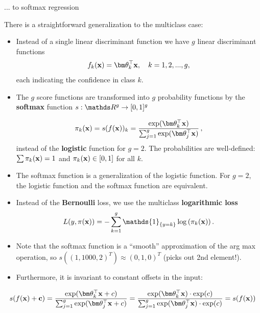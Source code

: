 \documentclass[11pt,compress,t,notes=noshow, xcolor=table]{beamer}
\begin{document}
\begin{vbframe}{... to softmax regression} 

There is a straightforward generalization to the multiclass case: 

\begin{itemize}
  \item Instead of a single linear discriminant function we have $g$ linear discriminant functions
    $$
      f_k(\xv) = \thetav_k^\top \xv, \quad k = 1, 2, ..., g,
    $$
  each indicating the confidence in class $k$.
  \item The $g$ score functions are transformed into $g$ probability functions by the \textbf{softmax} function $s:\R^g \to [0,1]^g$ 

  $$
    \pi_k(\xv) = s(\fx)_k = \frac{\exp(\thetav_k^\top \xv)}{\sum_{j = 1}^g \exp(\thetav_j^\top \xv) }\,,
  $$
  instead of the \textbf{logistic} function for $g = 2$. The probabilities are well-defined: $\sum \pi_k(\mathbf{x}) = 1$ and $\pi_k(\mathbf{x}) \in [0, 1]$ for all $k$. 

  \item The softmax function is a generalization of the logistic function. For $g = 2$, the logistic function and the softmax function are equivalent. 

  \item Instead of the \textbf{Bernoulli} loss, we use the multiclass \textbf{logarithmic loss}
   $$
    L(y, \pix) = - \sum_{k = 1}^g \mathds{1}_{\{y = k\}} \log\left(\pi_k(\xv)\right).
  $$ 
    \item Note that the softmax function is a \enquote{smooth} approximation of the arg max operation,
        so $s((1, 1000, 2)^T) \approx (0, 1, 0)^T$ (picks out 2nd element!).  
    \item Furthermore, it is invariant to constant offsets in the input:  
      \end{itemize}
    $$ 
    s(\fx + \mathbf{c}) = \frac{\exp(\thetav_k^\top \xv + c)}{\sum_{j = 1}^g \exp(\thetav_j^\top \xv + c)} = 
    \frac{\exp(\thetav_k^\top \xv)\cdot \exp(c)}{\sum_{j = 1}^g \exp(\thetav_j^\top \xv) \cdot \exp(c)} = 
    s(\fx)
    $$  


\end{vbframe}
\end{document}

